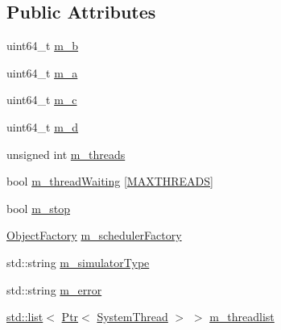 \subsection*{Public Attributes}
\begin{DoxyCompactItemize}
\item 
uint64\+\_\+t \hyperlink{classThreadedSimulatorEventsTestCase_a7aae6f983f4e3ebbff8bd40e7b070907}{m\+\_\+b}
\item 
uint64\+\_\+t \hyperlink{classThreadedSimulatorEventsTestCase_acfb06ea29c6c68f50c519f65c19cfe8c}{m\+\_\+a}
\item 
uint64\+\_\+t \hyperlink{classThreadedSimulatorEventsTestCase_a6c5c19d981eb1652301163115a2af2d8}{m\+\_\+c}
\item 
uint64\+\_\+t \hyperlink{classThreadedSimulatorEventsTestCase_a883333a1f60978b4715260612fded40a}{m\+\_\+d}
\item 
unsigned int \hyperlink{classThreadedSimulatorEventsTestCase_abd257402dfdeba9f78a88c16308feace}{m\+\_\+threads}
\item 
bool \hyperlink{classThreadedSimulatorEventsTestCase_a6446720106613ed6b8e2de71abbdc166}{m\+\_\+thread\+Waiting} \mbox{[}\hyperlink{threaded-test-suite_8cc_ab9eade334fd8a98c128802aec7e9191c}{M\+A\+X\+T\+H\+R\+E\+A\+DS}\mbox{]}
\item 
bool \hyperlink{classThreadedSimulatorEventsTestCase_a1766d752819df18fbbc8cadd0b1fd8be}{m\+\_\+stop}
\item 
\hyperlink{classns3_1_1ObjectFactory}{Object\+Factory} \hyperlink{classThreadedSimulatorEventsTestCase_a31f7916af8ab2f959bd2074a3c8b2343}{m\+\_\+scheduler\+Factory}
\item 
std\+::string \hyperlink{classThreadedSimulatorEventsTestCase_a85922ac1a2a8debfa0b5d4e33376f138}{m\+\_\+simulator\+Type}
\item 
std\+::string \hyperlink{classThreadedSimulatorEventsTestCase_a64d5754fc8377b07b8638f42f4989185}{m\+\_\+error}
\item 
\hyperlink{openflow-interface_8h_afd9bcfa176617760671b67580f536fa7}{std\+::list}$<$ \hyperlink{classns3_1_1Ptr}{Ptr}$<$ \hyperlink{classns3_1_1SystemThread}{System\+Thread} $>$ $>$ \hyperlink{classThreadedSimulatorEventsTestCase_a8b709eaeff9207f826fc1eda60ea4ea4}{m\+\_\+threadlist}
\end{DoxyCompactItemize}

